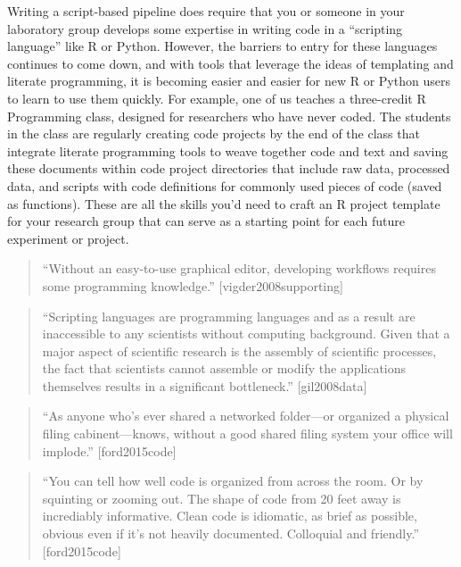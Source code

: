 \documentclass[]{tufte-book}
\begin{document}
Writing a script-based pipeline does require that you or someone in your laboratory
group develops some expertise in writing code in a ``scripting language'' like R or
Python. However, the barriers to entry for these languages continues to come down, and
with tools that leverage the ideas of templating and literate programming, it is
becoming easier and easier for new R or Python users to learn to use them quickly.
For example, one of us teaches a three-credit R Programming class, designed for researchers
who have never coded. The students in the class are regularly creating code projects
by the end of the class that integrate literate programming tools to weave together
code and text and saving these documents within code project directories that include
raw data, processed data, and scripts with code definitions for commonly used pieces of
code (saved as functions). These are all the skills you'd need to craft an R project
template for your research group that can serve as a starting point for each future
experiment or project.

\begin{quote}
``Without an easy-to-use graphical editor, developing workflows requires some programming
knowledge.'' {[}vigder2008supporting{]}
\end{quote}

\begin{quote}
``Scripting languages are programming languages and as a result are inaccessible to
any scientists without computing background. Given that a major aspect of scientific
research is the assembly of scientific processes, the fact that scientists cannot
assemble or modify the applications themselves results in a significant bottleneck.''
{[}gil2008data{]}
\end{quote}

\begin{quote}
``As anyone who's ever shared a networked folder---or organized a physical
filing cabinent---knows, without a good shared filing system your office will
implode.'' {[}ford2015code{]}
\end{quote}

\begin{quote}
``You can tell how well code is organized from across the room. Or by squinting or
zooming out. The shape of code from 20 feet away is incrediably informative. Clean
code is idiomatic, as brief as possible, obvious even if it's not heavily
documented. Colloquial and friendly.'' {[}ford2015code{]}
\end{quote}
\end{document}
